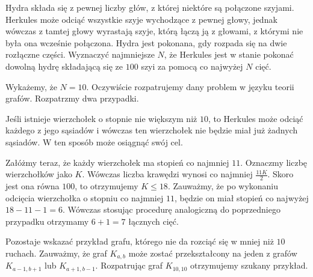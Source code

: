\vspace{5px}

\begin{problem}{6}
    Hydra składa się z pewnej liczby głów, z której niektóre są połączone szyjami. Herkules może odciąć wszystkie szyje wychodzące z pewnej głowy, jednak wówczas z tamtej głowy wyrastają szyje, którą łączą ją z głowami, z którymi nie była ona wcześnie połączona. Hydra jest pokonana, gdy rozpada się na dwie rozłączne części. Wyznaczyć najmniejsze $N$, że Herkules jest w stanie pokonać dowolną hydrę składającą się ze $100$ szyi za pomocą co najwyżej $N$ cięć.
\end{problem}

\noindent
Wykażemy, że $N = 10$. Oczywiście rozpatrujemy dany problem w języku teorii grafów. Rozpatrzmy dwa przypadki.

\vspace{10px}
\noindent
Jeśli istnieje wierzchołek o stopnie nie większym niż $10$, to Herkules może odciąć każdego z jego sąsiadów i wówczas ten wierzchołek nie będzie miał już żadnych sąsiadów. W ten sposób może osiągnąć swój cel.

\vspace{10px}
\noindent
Załóżmy teraz, że każdy wierzchołek ma stopień co najmniej $11$. Oznaczmy liczbę wierzchołków jako $K$. Wówczas liczba krawędzi wynosi co najmniej $\frac{11K}{2}$. Skoro jest ona równa $100$, to otrzymujemy $K \leqslant 18$. Zauważmy, że po wykonaniu odcięcia wierzchołka o stopniu co najmniej $11$, będzie on miał stopień co najwyżej $18 - 11 - 1 = 6$. Wówczas stosując procedurę analogiczną do poprzedniego przypadku otrzymamy $6 + 1 = 7$ łącznych cięć.


Pozostaje wskazać przykład grafu, którego nie da rozciąć się w mniej niż $10$ ruchach. Zauważmy, że graf $K_{a,b}$ może zostać przekształcony na jeden z grafów $K_{a - 1,b + 1}$ lub $K_{a + 1,b - 1}$. Rozpatrując graf $K_{10,10}$ otrzymujemy szukany przykład.
